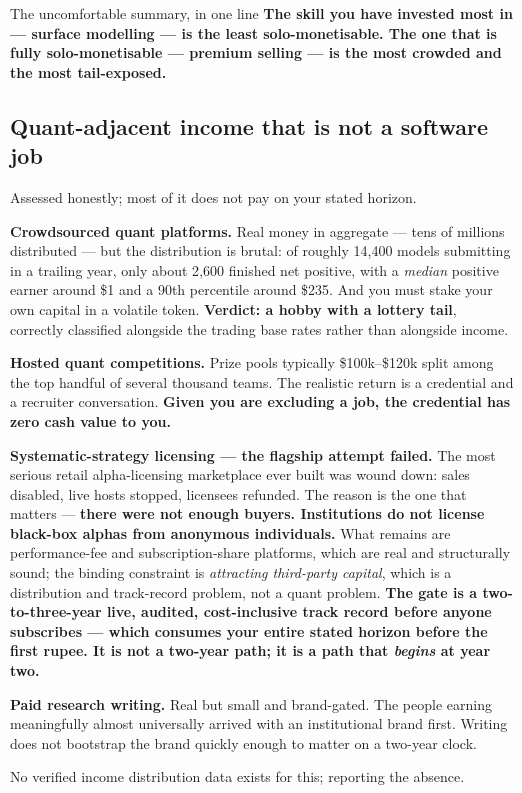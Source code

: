 \documentclass[11pt,a4paper]{article}
\newcommand{\srcnote}[1]{{\footnotesize\color{soft}#1\par}}
\begin{document}
\begin{keyfact}{The uncomfortable summary, in one line}
\textbf{The skill you have invested most in --- surface modelling --- is the least
solo-monetisable. The one that is fully solo-monetisable --- premium selling --- is
the most crowded and the most tail-exposed.}
\end{keyfact}

\subsection{Quant-adjacent income that is not a software job}

Assessed honestly; most of it does not pay on your stated horizon.

\textbf{Crowdsourced quant platforms.} Real money in aggregate --- tens of millions
distributed --- but the distribution is brutal: of roughly 14{,}400 models
submitting in a trailing year, only about 2{,}600 finished net positive, with a
\emph{median} positive earner around \$1 and a 90th percentile around \$235. And
you must stake your own capital in a volatile token. \textbf{Verdict: a hobby with
a lottery tail}, correctly classified alongside the trading base rates rather than
alongside income.

\textbf{Hosted quant competitions.} Prize pools typically \$100k--\$120k split
among the top handful of several thousand teams. The realistic return is a
credential and a recruiter conversation. \textbf{Given you are excluding a job, the
credential has zero cash value to you.}

\textbf{Systematic-strategy licensing --- the flagship attempt failed.} The most
serious retail alpha-licensing marketplace ever built was wound down: sales
disabled, live hosts stopped, licensees refunded. The reason is the one that
matters --- \textbf{there were not enough buyers. Institutions do not license
black-box alphas from anonymous individuals.} What remains are performance-fee and
subscription-share platforms, which are real and structurally sound; the binding
constraint is \emph{attracting third-party capital}, which is a distribution and
track-record problem, not a quant problem. \textbf{The gate is a two-to-three-year
live, audited, cost-inclusive track record before anyone subscribes --- which
consumes your entire stated horizon before the first rupee. It is not a two-year
path; it is a path that \emph{begins} at year two.}

\textbf{Paid research writing.} Real but small and brand-gated. The people earning
meaningfully almost universally arrived with an institutional brand first. Writing
does not bootstrap the brand quickly enough to matter on a two-year clock.
\srcnote{No verified income distribution data exists for this; reporting the absence.}
\end{document}
